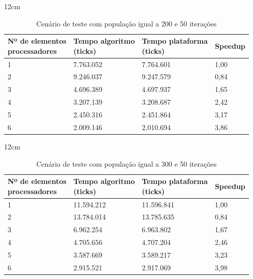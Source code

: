 \begin{table}[h]{12cm}
    \caption{Cenário de teste com população igual a 200 e 50 iterações}
    \label{cenario17}
    \begin{tabular}{llll}
        \hline
        \shortstack[l]{Nº de elementos \\ processadores} & \shortstack[l]{Tempo algoritmo \\ (ticks)} & \shortstack[l]{Tempo plataforma \\ (ticks)} & Speedup \\
        \hline
        1 & 7.763.052 & 7.764.601 & 1,00 \\
        2 & 9.246.037 & 9.247.579 & 0,84 \\
        3 & 4.696.389 & 4.697.937 &	1,65 \\
        4 & 3.207.139 & 3.208.687 & 2,42 \\
        5 & 2.450.316 & 2.451.864 & 3,17 \\
        6 & 2.009.146 & 2.010.694 & 3,86 \\
        \hline
    \end{tabular}
\end{table}

\begin{table}[h]{12cm}
    \caption{Cenário de teste com população igual a 300 e 50 iterações}
    \label{cenario18}
    \begin{tabular}{llll}
        \hline
        \shortstack[l]{Nº de elementos \\ processadores} & \shortstack[l]{Tempo algoritmo \\ (ticks)} & \shortstack[l]{Tempo plataforma \\ (ticks)} & Speedup \\
        \hline
        1 & 11.594.212 & 11.596.841 & 1,00 \\
        2 & 13.784.014 & 13.785.635 & 0,84 \\
        3 & 6.962.254  & 6.963.802  & 1,67 \\
        4 & 4.705.656  & 4.707.204  & 2,46 \\
        5 & 3.587.669  & 3.589.217  & 3,23 \\
        6 & 2.915.521  & 2.917.069  & 3,98 \\
        \hline
    \end{tabular}
\end{table}

